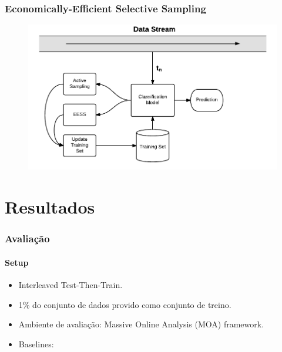 \documentclass[14pt]{beamer}
\begin{document}
\begin{frame}\frametitle{Economically-Efficient Selective Sampling}
\begin{figure}
\centering
\includegraphics[scale=0.7]{EESS}
\end{figure}
\end{frame}

\section{Resultados}
\begin{frame}
\frametitle{Avaliação}
\framesubtitle{Setup}
\begin{itemize}
    \item Interleaved Test-Then-Train.
    \item 1\% do conjunto de dados provido como conjunto de treino.
    \item Ambiente de avaliação: Massive Online Analysis (MOA) framework.
    \item Baselines:
\begin{table}
\centering
{}
\end{table}
\end{itemize}


\end{frame}
\end{document}
